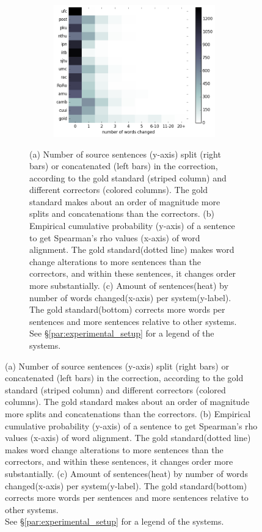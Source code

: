 \documentclass[letter,11pt]{article}
\newcommand{\com}[1]{}
\begin{document}
\begin{figure}[tbp]
{\begin{figure}[tbp]
				\begin{subfigure}[]{0.4\textwidth}
					\caption{\label{fig:words_changed}}
					\includegraphics[width = \textwidth]{words_differences_heat}
					\com{\caption{Amount of sentences(heat) by number of words changed(x-axis) per system(y-label). The gold standard(bottom) corrects more words per sentences and more sentences relative to other systems.\label{fig:words_changed}}}
				\end{subfigure}
				\caption{(a) Number of source sentences (y-axis) split 
					(right bars) or concatenated (left bars) in the correction, according to the gold standard (striped column) and different correctors (colored columns). The gold standard makes about an order of magnitude more splits and concatenations than the correctors.
					(b) Empirical cumulative probability (y-axis) of a sentence to get Spearman's rho values (x-axis) of word alignment. The gold standard(dotted line) makes word change alterations to more sentences than the correctors, and within these sentences, it changes order more substantially.
					(c) Amount of sentences(heat) by number of words changed(x-axis) per system(y-label). The gold standard(bottom) corrects more words per sentences and more sentences relative to other systems.\\
					See \S\ref{par:experimental_setup} for a legend
					of the systems.\label{fig:over-conservatism}}
				\com{\caption{	See \S\ref{par:experimental_setup} for a legend
						of the systems. \label{fig:over-conservatism}}}
			\end{figure}}
		\end{figure}
		
\end{document}
